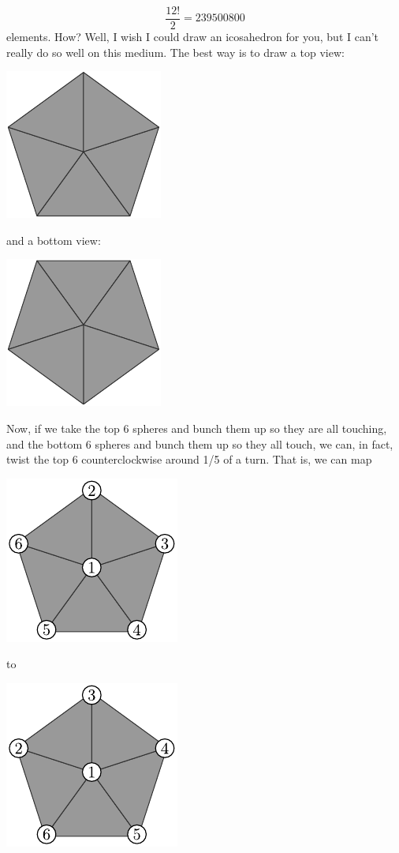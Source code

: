 \[ \frac{12!}{2} = 239500800\]
elements. How? Well, I wish I could draw an icosahedron for you, but I can't really do so well on this medium. The best way is to draw a top view:
\begin{center}
\includegraphics[]{figures/wk20_fig6.pdf}
\end{center}
and a bottom view:
\begin{center}
\includegraphics[]{figures/wk20_fig7.pdf}
\end{center}
Now, if we take the top 6 spheres and bunch them up so they are all touching, and the bottom 6 spheres and bunch them up so they all touch, we can, in fact, twist the top 6 counterclockwise around 1/5 of a turn. That is, we can map
\begin{center}
\includegraphics[]{figures/wk20_fig8.pdf}
\end{center}
to
\begin{center}
\includegraphics[]{figures/wk20_fig9.pdf}
\end{center}

